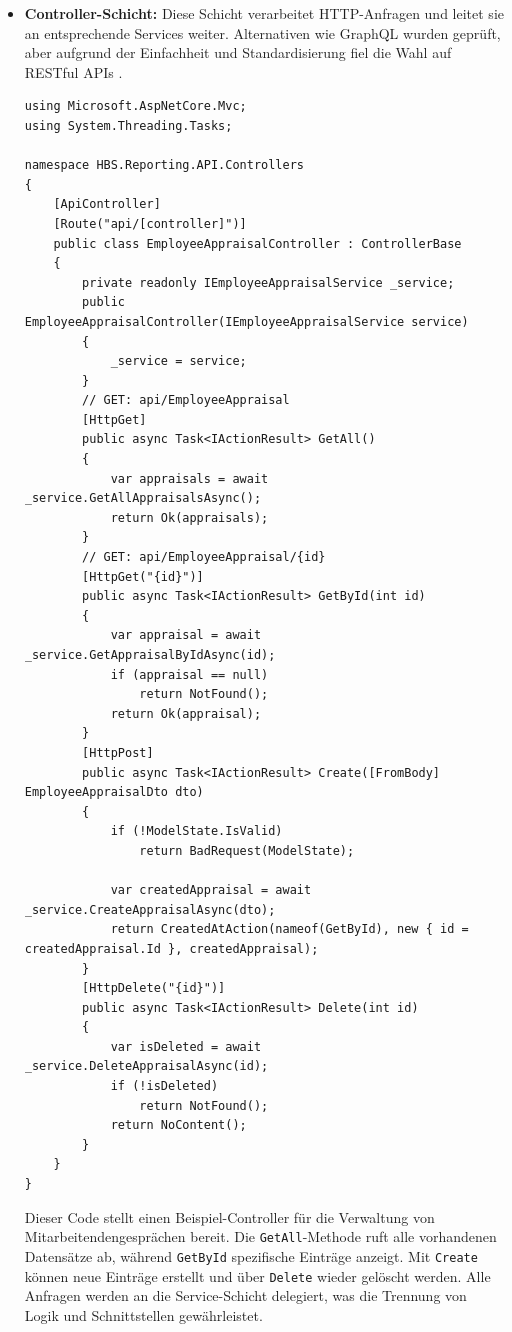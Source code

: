 \begin{itemize}
     \item \textbf{Controller-Schicht:} Diese Schicht verarbeitet HTTP-Anfragen und leitet sie an entsprechende Services weiter. Alternativen wie GraphQL wurden geprüft, aber aufgrund der Einfachheit und Standardisierung fiel die Wahl auf RESTful APIs \cite{fielding2000rest}.

\begin{verbatim}
using Microsoft.AspNetCore.Mvc;
using System.Threading.Tasks;

namespace HBS.Reporting.API.Controllers
{
    [ApiController]
    [Route("api/[controller]")]
    public class EmployeeAppraisalController : ControllerBase
    {
        private readonly IEmployeeAppraisalService _service;
        public EmployeeAppraisalController(IEmployeeAppraisalService service)
        {
            _service = service;
        }
        // GET: api/EmployeeAppraisal
        [HttpGet]
        public async Task<IActionResult> GetAll()
        {
            var appraisals = await _service.GetAllAppraisalsAsync();
            return Ok(appraisals);
        }
        // GET: api/EmployeeAppraisal/{id}
        [HttpGet("{id}")]
        public async Task<IActionResult> GetById(int id)
        {
            var appraisal = await _service.GetAppraisalByIdAsync(id);
            if (appraisal == null)
                return NotFound();
            return Ok(appraisal);
        }
        [HttpPost]
        public async Task<IActionResult> Create([FromBody] EmployeeAppraisalDto dto)
        {
            if (!ModelState.IsValid)
                return BadRequest(ModelState);

            var createdAppraisal = await _service.CreateAppraisalAsync(dto);
            return CreatedAtAction(nameof(GetById), new { id = createdAppraisal.Id }, createdAppraisal);
        }
        [HttpDelete("{id}")]
        public async Task<IActionResult> Delete(int id)
        {
            var isDeleted = await _service.DeleteAppraisalAsync(id);
            if (!isDeleted)
                return NotFound();
            return NoContent();
        }
    }
}
\end{verbatim}

Dieser Code stellt einen Beispiel-Controller für die Verwaltung von Mitarbeitendengesprächen bereit. Die \texttt{GetAll}-Methode ruft alle vorhandenen Datensätze ab, während \texttt{GetById} spezifische Einträge anzeigt. Mit \texttt{Create} können neue Einträge erstellt und über \texttt{Delete} wieder gelöscht werden. Alle Anfragen werden an die Service-Schicht delegiert, was die Trennung von Logik und Schnittstellen gewährleistet.


\end{itemize}
